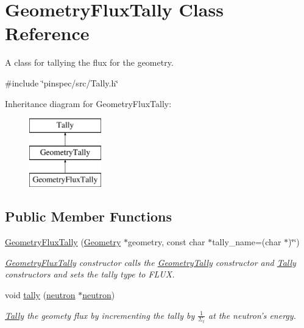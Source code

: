 \hypertarget{classGeometryFluxTally}{\section{Geometry\-Flux\-Tally Class Reference}
\label{classGeometryFluxTally}
}


A class for tallying the flux for the geometry.  




{\ttfamily \#include \char`\"{}pinspec/src/\-Tally.\-h\char`\"{}}

Inheritance diagram for Geometry\-Flux\-Tally\-:\begin{figure}[H]
\begin{center}
\leavevmode
\includegraphics[height=3.000000cm]{classGeometryFluxTally}
\end{center}
\end{figure}
\subsection*{Public Member Functions}
\begin{DoxyCompactItemize}
\item 
\hyperlink{classGeometryFluxTally_afe633b1d646dfe7bbf3232cb49095356}{Geometry\-Flux\-Tally} (\hyperlink{classGeometry}{Geometry} $\ast$geometry, const char $\ast$tally\-\_\-name=(char $\ast$)\char`\"{}\char`\"{})
\begin{DoxyCompactList}\small\item\em \hyperlink{classGeometryFluxTally}{Geometry\-Flux\-Tally} constructor calls the \hyperlink{classGeometryTally}{Geometry\-Tally} constructor and \hyperlink{classTally}{Tally} constructors and sets the tally type to F\-L\-U\-X. \end{DoxyCompactList}\item 
void \hyperlink{classGeometryFluxTally_a2c7d83a4577cff56a1cecf8a339db547}{tally} (\hyperlink{structneutron}{neutron} $\ast$\hyperlink{structneutron}{neutron})
\begin{DoxyCompactList}\small\item\em \hyperlink{classTally}{Tally} the geomety flux by incrementing the tally by $ \frac{1}{\Sigma_t} $ at the neutron's energy. \end{DoxyCompactList}\end{DoxyCompactItemize}
